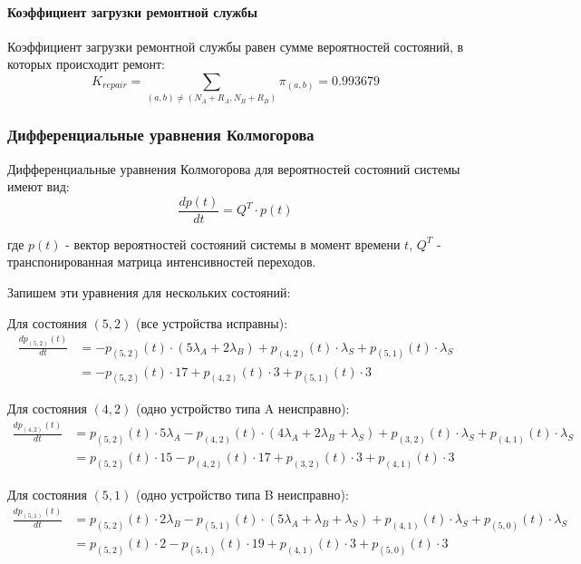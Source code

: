 \paragraph{Коэффициент загрузки ремонтной службы}
Коэффициент загрузки ремонтной службы равен сумме вероятностей состояний, в которых происходит ремонт:
\begin{equation}
K_{repair} = \sum_{(a,b) \neq (N_A+R_A, N_B+R_B)} \pi_{(a,b)} = 0.993679
\end{equation}

\subsubsection{Дифференциальные уравнения Колмогорова}

Дифференциальные уравнения Колмогорова для вероятностей состояний системы имеют вид:
\begin{equation}
\frac{dp(t)}{dt} = Q^T \cdot p(t)
\end{equation}

где $p(t)$ - вектор вероятностей состояний системы в момент времени $t$, $Q^T$ - транспонированная матрица интенсивностей переходов.

Запишем эти уравнения для нескольких состояний:

Для состояния $(5, 2)$ (все устройства исправны):
\begin{align}
\frac{dp_{(5,2)}(t)}{dt} &= -p_{(5,2)}(t) \cdot (5\lambda_A + 2\lambda_B) + p_{(4,2)}(t) \cdot \lambda_S + p_{(5,1)}(t) \cdot \lambda_S \\
&= -p_{(5,2)}(t) \cdot 17 + p_{(4,2)}(t) \cdot 3 + p_{(5,1)}(t) \cdot 3
\end{align}

Для состояния $(4, 2)$ (одно устройство типа A неисправно):
\begin{align}
\frac{dp_{(4,2)}(t)}{dt} &= p_{(5,2)}(t) \cdot 5\lambda_A - p_{(4,2)}(t) \cdot (4\lambda_A + 2\lambda_B + \lambda_S) + p_{(3,2)}(t) \cdot \lambda_S + p_{(4,1)}(t) \cdot \lambda_S \\
&= p_{(5,2)}(t) \cdot 15 - p_{(4,2)}(t) \cdot 17 + p_{(3,2)}(t) \cdot 3 + p_{(4,1)}(t) \cdot 3
\end{align}

Для состояния $(5, 1)$ (одно устройство типа B неисправно):
\begin{align}
\frac{dp_{(5,1)}(t)}{dt} &= p_{(5,2)}(t) \cdot 2\lambda_B - p_{(5,1)}(t) \cdot (5\lambda_A + \lambda_B + \lambda_S) + p_{(4,1)}(t) \cdot \lambda_S + p_{(5,0)}(t) \cdot \lambda_S \\
&= p_{(5,2)}(t) \cdot 2 - p_{(5,1)}(t) \cdot 19 + p_{(4,1)}(t) \cdot 3 + p_{(5,0)}(t) \cdot 3
\end{align}

